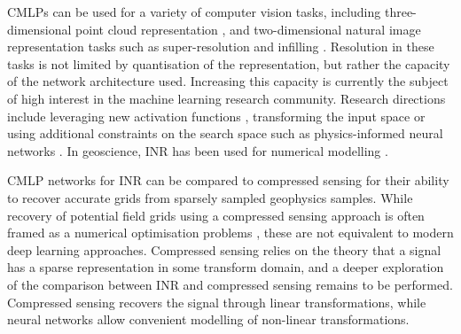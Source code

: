 \documentclass[manuscript.tex]{subfiles}
\begin{document}
CMLPs can be used for a variety of computer vision tasks, including three-dimensional point cloud representation \parencite{qiPointNetDeepHierarchical2017}, and two-dimensional natural image representation tasks such as super-resolution and infilling \parencite{leeLocalTextureEstimator2022, chenLearningContinuousImage2021}.
Resolution in these tasks is not limited by quantisation of the representation, but rather the capacity of the network architecture used.
Increasing this capacity is currently the subject of high interest in the machine learning research community.
Research directions include leveraging new activation functions \parencite{saragadamWIREWaveletImplicit2023}, transforming the input space \parencite[e.g.][]{benbarkaSeeingImplicitNeural2022} or using additional constraints on the search space such as physics-informed neural networks \parencite{raissiPhysicsinformedNeuralNetworks2019}.
In geoscience, INR has been used for numerical modelling \parencite{hillierGeoINRImplicitNeural2023}.

CMLP networks for INR can be compared to compressed sensing \parencite{candesIntroductionCompressiveSampling2008} for their ability to recover accurate grids from sparsely sampled geophysics samples.
While recovery of potential field grids using a compressed sensing approach is often framed as a numerical optimisation problems \parencite[e.g.][]{yangAirborneGravimetryData2015,xuGravityAnomalyReconstruction2019}, these are not equivalent to modern deep learning approaches.
Compressed sensing relies on the theory that a signal has a sparse representation in some transform domain, and a deeper exploration of the comparison between INR and compressed sensing remains to be performed.
Compressed sensing recovers the signal through linear transformations, while neural networks allow convenient modelling of non-linear transformations.
\end{document}

